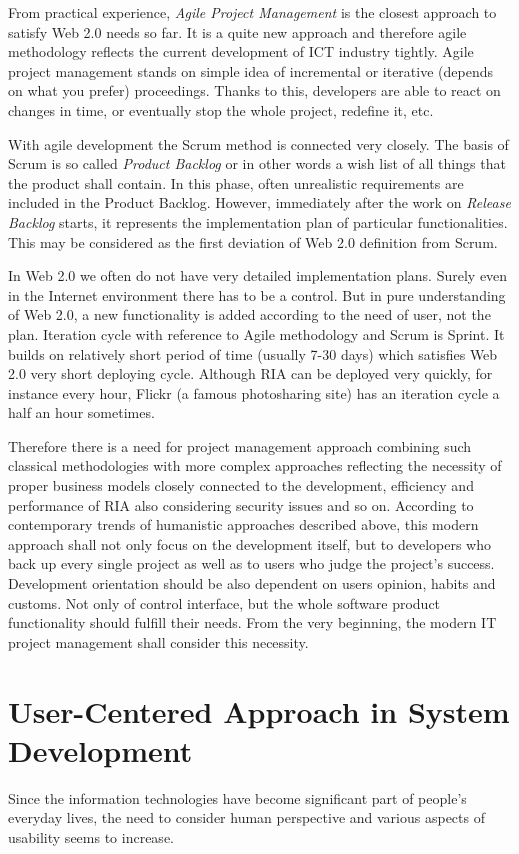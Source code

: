 \documentclass[graybox]{svmult}
\begin{document}
From practical experience, \emph{Agile Project Management} is the closest
approach to satisfy Web 2.0 needs so far. It is a quite new approach and
therefore agile methodology reflects the current development of ICT industry
tightly. Agile project management stands on simple idea of incremental or
iterative (depends on what you prefer) proceedings. Thanks to this, developers
are able to react on changes in time, or eventually stop the whole project,
redefine it, etc.

With agile development the Scrum method is connected very closely. The basis
of Scrum is so called \emph{Product Backlog} or in other words a wish list of
all things that the product shall contain. In this phase, often unrealistic
requirements are included in the Product Backlog. However, immediately after
the work on \emph{Release Backlog} starts, it represents the implementation
plan of particular functionalities. This may be considered as the first
deviation of Web 2.0 definition from Scrum.

In Web 2.0 we often do not have very detailed implementation plans. Surely
even in the Internet environment there has to be a control. But in pure
understanding of Web 2.0, a new functionality is added according to the need
of user, not the plan. Iteration cycle with reference to Agile methodology and
Scrum is Sprint. It builds on relatively short period of time (usually 7-30
days) which satisfies Web 2.0 very short deploying cycle. Although RIA can be
deployed very quickly, for instance every hour, Flickr (a famous
photosharing site) has an iteration cycle a half an hour sometimes.

Therefore there is a need for project management approach combining such
classical methodologies with more complex approaches reflecting the necessity
of proper business models closely connected to the development, efficiency and
performance of RIA also considering security issues and so on. According to
contemporary trends of humanistic approaches described above, this modern
approach shall not only focus on the development itself, but to developers
who back up every single project as well as to users who judge the project's
success. Development orientation should be also dependent on users opinion,
habits and customs. Not only of control interface, but the whole software
product functionality should fulfill their needs. From the very beginning, the
modern IT project management shall consider this necessity.

\section{User-Centered Approach in System Development}
Since the information technologies have become significant part of people's
everyday lives, the need to consider human perspective and various aspects of
usability seems to increase. 
\end{document}
